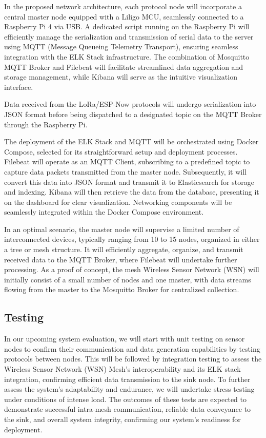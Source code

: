 In the proposed network architecture, each protocol node will incorporate a central master node equipped with a Liligo MCU, seamlessly connected to a Raspberry Pi 4 via USB. A dedicated script running on the Raspberry Pi will efficiently manage the serialization and transmission of serial data to the server using MQTT (Message Queueing Telemetry Transport), ensuring seamless integration with the ELK Stack infrastructure. The combination of Mosquitto MQTT Broker and Filebeat will facilitate streamlined data aggregation and storage management, while Kibana will serve as the intuitive visualization interface.

Data received from the LoRa/ESP-Now protocols will undergo serialization into JSON format before being dispatched to a designated topic on the MQTT Broker through the Raspberry Pi.

The deployment of the ELK Stack and MQTT will be orchestrated using Docker Compose, selected for its straightforward setup and deployment processes. Filebeat will operate as an MQTT Client, subscribing to a predefined topic to capture data packets transmitted from the master node. Subsequently, it will convert this data into JSON format and transmit it to Elasticsearch for storage and indexing. Kibana will then retrieve the data from the database, presenting it on the dashboard for clear visualization. Networking components will be seamlessly integrated within the Docker Compose environment.

In an optimal scenario, the master node will supervise a limited number of interconnected devices, typically ranging from 10 to 15 nodes, organized in either a tree or mesh structure. It will efficiently aggregate, organize, and transmit received data to the MQTT Broker, where Filebeat will undertake further processing. As a proof of concept, the mesh Wireless Sensor Network (WSN) will initially consist of a small number of nodes and one master, with data streams flowing from the master to the Mosquitto Broker for centralized collection.


\subsection{Testing}\label{testing}
In our upcoming system evaluation, we will start with unit testing on sensor nodes to confirm their communication and data generation capabilities by testing protocols between nodes. This will be followed by integration testing to assess the Wireless Sensor Network (WSN) Mesh's interoperability and its ELK stack integration, confirming efficient data transmission to the sink node. To further assess the system's adaptability and endurance, we will undertake stress testing under conditions of intense load. The outcomes of these tests are expected to demonstrate successful intra-mesh communication, reliable data conveyance to the sink, and overall system integrity, confirming our system's readiness for deployment.

